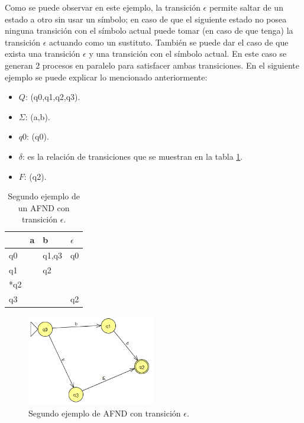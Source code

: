 \hspace*{1cm}Como se puede observar en este ejemplo, la transición $\epsilon$ permite saltar de un estado a otro sin usar un símbolo; en caso de que el siguiente estado no posea ninguna transición con el símbolo actual puede tomar (en caso de que tenga) la transición $\epsilon$ actuando como un sustituto. También se puede dar el caso de que exista una transición $\epsilon$ y una transición con el símbolo actual. En este caso se generan 2 procesos en paralelo para satisfacer ambas transiciones. En el siguiente ejemplo se puede explicar lo mencionado anteriormente:

 \begin{itemize}
\item \textbf{$Q$}: (q0,q1,q2,q3).
\item \textbf{$\Sigma$}: (a,b).
\item \textbf{$q0$}: (q0).
\item \textbf{$\delta$}: es la relación de transiciones que se muestran en la tabla \ref{table:EjemploAFND2}.
\item \textbf{$F$}: (q2).
\end{itemize}

\begin{table}[hbtp]
\centering
   \caption{Segundo ejemplo de un AFND con transición $\epsilon$.}
   \begin{tabular}{ | l | l | l | l |}
   \hline
     \rowcolor[gray]{0.5}
          & a &  b     & $\epsilon$   \\ \hline
       q0 &   & q1,q3  & q0          \\ \hline   
       q1 &   & q2     &             \\ \hline  
      *q2 &   &        &             \\ \hline  
       q3 &   &        & q2          \\ \hline  
   \end{tabular}
   \label{table:EjemploAFND2}
\end{table}

 \begin{figure}[hbtp]
    \centering
        \includegraphics[width=0.5\textwidth]{MarcoTeorico/Imagenes/AFN2_b.png}
        \caption{Segundo ejemplo de AFND con transición $\epsilon$.}     
        \label{fig:AFN2.png}
\end{figure} 

